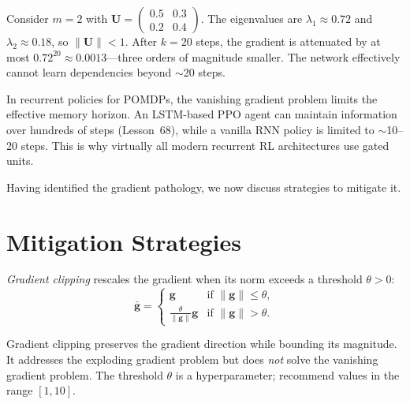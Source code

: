 \documentclass[11pt,a4paper]{article}
\begin{document}
\begin{example}
\label{ex:vanishing-demo}
Consider $m = 2$ with
$\mathbf{U} = \begin{pmatrix} 0.5 & 0.3 \\ 0.2 & 0.4 \end{pmatrix}$.
The eigenvalues are $\lambda_1 \approx 0.72$ and
$\lambda_2 \approx 0.18$, so $\|\mathbf{U}\| < 1$.  After $k = 20$
steps, the gradient is attenuated by at most $0.72^{20} \approx
0.0013$---three orders of magnitude smaller.  The network effectively
cannot learn dependencies beyond $\sim$20 steps.
\end{example}

\begin{rlconnection}[title={Gradient Pathology in Deep RL}]
In recurrent policies for POMDPs, the vanishing gradient problem
limits the effective memory horizon.  An LSTM-based PPO agent can
maintain information over hundreds of steps (Lesson~68), while a
vanilla RNN policy is limited to $\sim$10--20 steps.  This is why
virtually all modern recurrent RL architectures use gated units.
\end{rlconnection}

Having identified the gradient pathology, we now discuss strategies
to mitigate it.

\section{Mitigation Strategies}
\label{sec:mitigation}

\begin{definition}
\label{def:grad-clip}
\emph{Gradient clipping} rescales the gradient when its norm exceeds
a threshold $\theta > 0$:
\begin{equation}
  \bar{\mathbf{g}} = \begin{cases}
    \mathbf{g} & \text{if } \|\mathbf{g}\| \leq \theta, \\
    \frac{\theta}{\|\mathbf{g}\|} \mathbf{g}
      & \text{if } \|\mathbf{g}\| > \theta.
  \end{cases}
  \label{eq:grad-clip}
\end{equation}
\end{definition}

\begin{remark}
Gradient clipping preserves the gradient direction while bounding its
magnitude.  It addresses the exploding gradient problem but does
\emph{not} solve the vanishing gradient problem.  The threshold
$\theta$ is a hyperparameter; \citet{pascanu2013} recommend values in
the range $[1, 10]$.
\end{remark}
\end{document}
